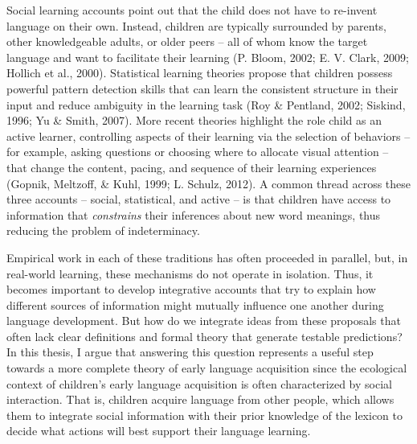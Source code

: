 \documentclass[oneside]{report}
\begin{document}
Social learning accounts point out that the child does not have to
re-invent language on their own. Instead, children are typically
surrounded by parents, other knowledgeable adults, or older peers -- all
of whom know the target language and want to facilitate their learning
(P. Bloom, 2002; E. V. Clark, 2009; Hollich et al., 2000). Statistical
learning theories propose that children possess powerful pattern
detection skills that can learn the consistent structure in their input
and reduce ambiguity in the learning task (Roy \& Pentland, 2002;
Siskind, 1996; Yu \& Smith, 2007). More recent theories highlight the
role child as an active learner, controlling aspects of their learning
via the selection of behaviors -- for example, asking questions or
choosing where to allocate visual attention -- that change the content,
pacing, and sequence of their learning experiences (Gopnik, Meltzoff, \&
Kuhl, 1999; L. Schulz, 2012). A common thread across these three
accounts -- social, statistical, and active -- is that children have
access to information that \emph{constrains} their inferences about new
word meanings, thus reducing the problem of indeterminacy.

Empirical work in each of these traditions has often proceeded in
parallel, but, in real-world learning, these mechanisms do not operate
in isolation. Thus, it becomes important to develop integrative accounts
that try to explain how different sources of information might mutually
influence one another during language development. But how do we
integrate ideas from these proposals that often lack clear definitions
and formal theory that generate testable predictions? In this thesis, I
argue that answering this question represents a useful step towards a
more complete theory of early language acquisition since the ecological
context of children's early language acquisition is often characterized
by social interaction. That is, children acquire language from other
people, which allows them to integrate social information with their
prior knowledge of the lexicon to decide what actions will best support
their language learning.
\end{document}
